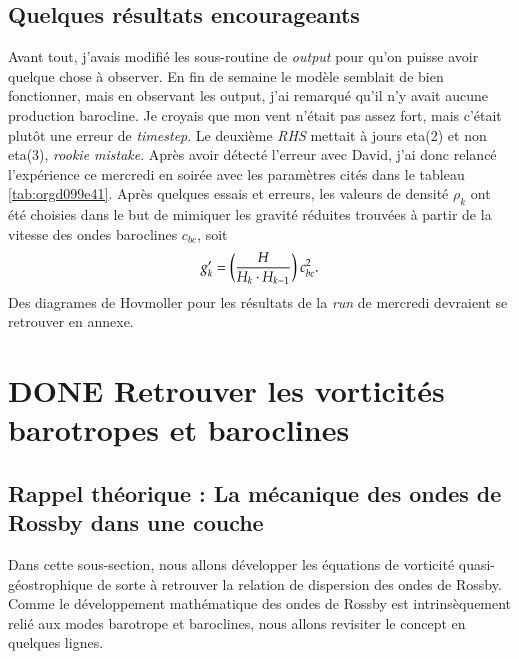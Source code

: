 \documentclass{article}
\numberwithin{equation}{section}
\begin{document}
\subsection{Quelques résultats encourageants}
\label{sec:org5f66570}
Avant tout, j'avais modifié les sous-routine de \emph{output} pour qu'on puisse avoir quelque chose à observer.
En fin de semaine le modèle semblait de bien fonctionner, mais en observant les output, j'ai remarqué qu'il n'y avait aucune production barocline.
Je croyais que mon vent n'était pas assez fort, mais c'était plutôt une erreur de \emph{timestep}.
Le deuxième \emph{RHS} mettait à jours eta(2) et non eta(3), \emph{rookie mistake}.
Après avoir détecté l'erreur avec David, j'ai donc relancé l'expérience ce mercredi en soirée avec les paramètres cités dans le tableau \ref{tab:orgd099e41}.
Après quelques essais et erreurs, les valeurs de densité \(\rho_k\) ont été choisies dans le but de mimiquer les gravité réduites trouvées à partir de la vitesse des ondes baroclines \(c_{bc}\), soit
\begin{equation}
g_k' = \qty(\frac{H}{H_k\cdot H_{k-1}}) \ c_{bc}^2.
\end{equation}
Des diagrames de Hovmoller pour les résultats de la \emph{run} de mercredi devraient se retrouver en annexe.

\section{{\bfseries\sffamily DONE} Retrouver les vorticités barotropes et baroclines}
\label{sec:org241782b}
\subsection{\textbf{Rappel théorique} :  La mécanique des ondes de Rossby dans une couche}
\label{sec:orgf103ec3}
Dans cette sous-section, nous allons développer les équations de vorticité quasi-géostrophique de sorte à retrouver la relation de dispersion des ondes de Rossby.
Comme le développement mathématique des ondes de Rossby est intrinsèquement relié aux modes barotrope et baroclines, nous allons revisiter le concept en quelques lignes.\bigskip
\end{document}
